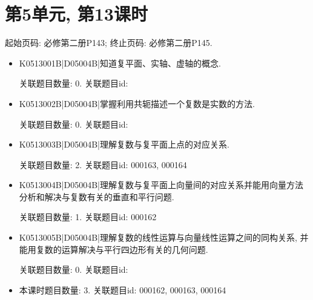\section*{第5单元, 第13课时}
起始页码: 必修第二册P143; 终止页码: 必修第二册P145.
\begin{itemize}
\item K0513001B|D05004B|知道复平面、实轴、虚轴的概念.

关联题目数量: 0. 关联题目id: 

\item K0513002B|D05004B|掌握利用共轭描述一个复数是实数的方法.

关联题目数量: 0. 关联题目id: 

\item K0513003B|D05004B|理解复数与复平面上点的对应关系.

关联题目数量: 2. 关联题目id: 000163, 000164

\item K0513004B|D05004B|理解复数与复平面上向量间的对应关系并能用向量方法分析和解决与复数有关的垂直和平行问题.

关联题目数量: 1. 关联题目id: 000162

\item K0513005B|D05004B|理解复数的线性运算与向量线性运算之间的同构关系, 并能用复数的运算解决与平行四边形有关的几何问题.

关联题目数量: 0. 关联题目id: 

\item 本课时题目数量: 3. 关联题目id: 000162, 000163, 000164

\end{itemize}

